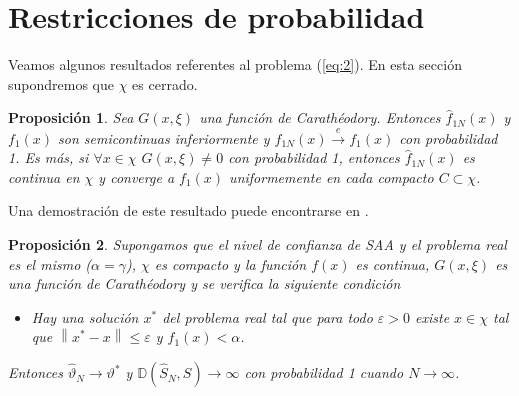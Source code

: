 \documentclass[twoside,a4paper,openright,12pt]{book}
\newtheorem{prop}{Proposici\'on}[section]
\providecommand{\conve}{\xrightarrow{e}}
\newcommand{\D}{\mathbb{D}}
\providecommand{\norm}[1]{\left\lVert#1\right\rVert}
\newcommand{\va}{\hat{\vartheta}_N}
\begin{document}
\section{Restricciones de probabilidad}
Veamos algunos resultados referentes al problema (\ref{eq:2}). En esta sección supondremos que $\chi$ es cerrado. 
\begin{prop}
Sea $G(x,\xi)$ una función de Carathéodory. Entonces $\hat{f}_{1N}(x) $ y $f_1(x)$ son semicontinuas inferiormente y $\hat{f}_{1N}(x)\conve f_1(x)$ con probabilidad 1. Es más, si $\forall x\in \chi$ $G(x,\xi)\neq 0$ con probabilidad 1, entonces $\hat{f}_{1N}(x)$ es continua en $\chi$ y converge a $f_1(x)$ uniformemente en cada compacto $C\subset \chi$.
\end{prop}
Una demostración de este resultado puede encontrarse en \cite{chance}.
\begin{prop}
Supongamos que el nivel de confianza de SAA y el problema real es el mismo ($\alpha=\gamma$), $\chi$ es compacto y la función $f(x)$ es continua, $G(x,\xi)$ es una función de Carathéodory y se verifica la siguiente condición
\begin{itemize}
\item[(A)] Hay una solución $x^*$ del problema real tal que para todo $\varepsilon>0$ existe $x\in \chi$ tal que $\norm{x^*-x}\leq \varepsilon$ y $f_1(x)<\alpha$.
\end{itemize}
Entonces $\va\to\vartheta^*$ y $\D(\hat{S}_N,S)\to\infty$ con probabilidad 1 cuando $N\to\infty$.
\end{prop}
\end{document}
